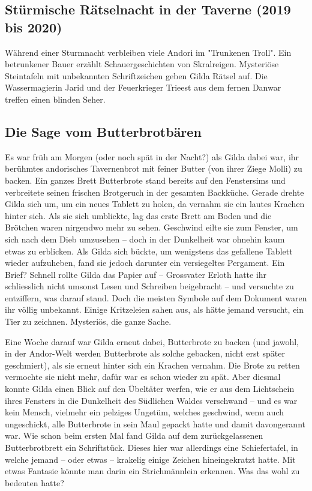 \begin{chapterbox}
    \chapter{Stürmische Rätselnacht in der Taverne (2019 bis 2020)}
    \label{Stürmische Rätselnacht in der Taverne (2019 bis 2020)}


    Während einer Sturmnacht verbleiben viele Andori im "Trunkenen Troll". Ein betrunkener Bauer erzählt Schauergeschichten von Skralreigen. Mysteriöse Steintafeln mit unbekannten Schriftzeichen geben Gilda Rätsel auf. Die Wassermagierin Jarid und der Feuerkrieger Trieest aus dem fernen Danwar treffen einen blinden Seher.
\end{chapterbox}



\section{Die Sage vom Butterbrotbären}


Es war früh am Morgen (oder noch spät in der Nacht?) als Gilda dabei war, ihr berühmtes andorisches Tavernenbrot mit feiner Butter (von ihrer Ziege Molli) zu backen. Ein ganzes Brett Butterbrote stand bereits auf den Fenstersims und verbreitete seinen frischen Brotgeruch in der gesamten Backküche. Gerade drehte Gilda sich um, um ein neues Tablett zu holen, da vernahm sie ein lautes Krachen hinter sich. Als sie sich umblickte, lag das erste Brett am Boden und die Brötchen waren nirgendwo mehr zu sehen. Geschwind eilte sie zum Fenster, um sich nach dem Dieb umzusehen – doch in der Dunkelheit war ohnehin kaum etwas zu erblicken. Als Gilda sich bückte, um wenigstens das gefallene Tablett wieder aufzuheben, fand sie jedoch darunter ein versiegeltes Pergament. Ein Brief? Schnell rollte Gilda das Papier auf – Grossvater Erloth hatte ihr schliesslich nicht umsonst Lesen und Schreiben beigebracht – und versuchte zu entziffern, was darauf stand. Doch die meisten Symbole auf dem Dokument waren ihr völlig unbekannt. Einige Kritzeleien sahen aus, als hätte jemand versucht, ein Tier zu zeichnen. Mysteriös, die ganze Sache.

Eine Woche darauf war Gilda erneut dabei, Butterbrote zu backen (und jawohl, in der Andor-Welt werden Butterbrote als solche gebacken, nicht erst später geschmiert), als sie erneut hinter sich ein Krachen vernahm. Die Brote zu retten vermochte sie nicht mehr, dafür war es schon wieder zu spät. Aber diesmal konnte Gilda einen Blick auf den Übeltäter werfen, wie er aus dem Lichtschein ihres Fensters in die Dunkelheit des Südlichen Waldes verschwand – und es war kein Mensch, vielmehr ein pelziges Ungetüm, welches geschwind, wenn auch ungeschickt, alle Butterbrote in sein Maul gepackt hatte und damit davongerannt war. Wie schon beim ersten Mal fand Gilda auf dem zurückgelassenen Butterbrotbrett ein Schriftstück. Dieses hier war allerdings eine Schiefertafel, in welche jemand – oder etwas – krakelig einige Zeichen hineingekratzt hatte. Mit etwas Fantasie könnte man darin ein Strichmännlein erkennen. Was das wohl zu bedeuten hatte?

